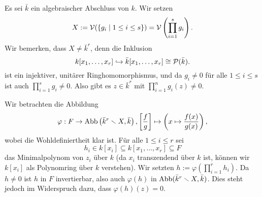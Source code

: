 \documentclass[a4paper,10pt]{article}
\begin{document}
Es sei $\bar{k}$ ein algebraischer Abschluss von $k$. Wir setzen
\[
 X := \mathcal{V}(\{g_i \mid 1 \leq i \leq s\}) = \mathcal{V}\left(\prod_{i=1}^s g_i\right).
\]
Wir bemerken, dass $X \neq \bar{k}^r$, denn die Inklusion
\[
 k[x_1, \ldots, x_r] \hookrightarrow \bar{k}[x_1, \ldots, x_r] \cong \mathcal{P}(\bar{k}).
\]
ist ein injektiver, unitärer Ringhomomorphismus, und da $g_i \neq 0$ für alle $1 \leq i \leq s$ ist auch $\prod_{i=1}^s g_i \neq 0$. Also gibt es $z \in \bar{k}^r$ mit $\prod_{i=1}^n g_i (z) \neq 0$.

Wir betrachten die Abbildung
\[
 \varphi : F \to \operatorname{Abb}\left(\bar{k}^r \smallsetminus X, \bar{k}\right),
 \left[ \frac{f}{g} \right] \mapsto \left( x \mapsto \frac{f(x)}{g(x)} \right),
\]
wobei die Wohldefiniertheit klar ist. Für alle $1 \leq i \leq r$ sei
\[
 h_i \in k[x_i] \subseteq k[x_1, \ldots, x_r] \subseteq F
\]
das Minimalpolynom von $z_i$ über $k$ (da $x_i$ transzendend über $k$ ist, können wir $k[x_i]$ als Polynomring über $k$ verstehen). Wir setzten $h := \varphi(\prod_{i=1}^r h_i)$. Da $h \neq 0$ ist $h$ in $F$ invertierbar, also auch $\varphi(h)$ in $\operatorname{Abb}(\bar{k}^r \smallsetminus X, \bar{k})$. Dies steht jedoch im Widerspruch dazu, dass $\varphi(h)(z) = 0$.
\end{document}
